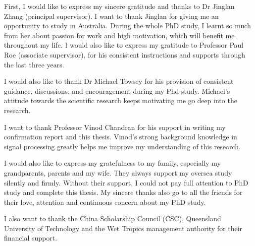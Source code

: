 \begin{ack}
First, I would like to express my sincere gratitude and thanks to Dr Jinglan Zhang (principal supervisor). I want to thank Jinglan for giving me an opportunity to study in Australia. During the whole PhD study, I learnt so much from her about passion for work and high motivation, which will benefit me throughout my life. 
I would also like to express my gratitude to Professor Paul Roe (associate supervisor), for his consistent instructions and supports through the last three years.  

I would also like to thank Dr Michael Towsey for his provision of consistent guidance, discussions, and encouragement during my Phd study. Michael's attitude towards the scientific research keeps motivating me go deep into the research.  


I want to thank Professor Vinod Chandran for his support in writing my confirmation report and this thesis. Vinod's strong background knowledge in signal processing greatly helps me improve my understanding of this research.

I would also like to express my gratefulness to my family, especially my grandparents, parents and my wife. They always support my oversea study silently and firmly. Without their support, I could not pay full attention to PhD study and complete this thesis. 
My sincere thanks also go to all the friends for their love, attention and continuous concern about my PhD study. 

I also want to thank the China Scholarship Council (CSC), Queensland University of Technology and the Wet Tropics management authority for their financial support. 

\end{ack}





\afterpreface
